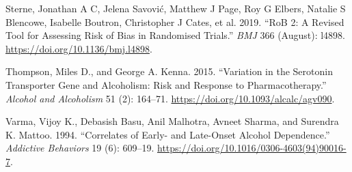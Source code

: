 \documentclass[
  12pt,
]{article}
\newlength{\cslhangindent}
\newenvironment{CSLReferences}[2] %
 {\begin{list}{}{%
  \setlength{\itemindent}{0pt}
  \setlength{\leftmargin}{0pt}
  \setlength{\parsep}{0pt}
  \ifodd #1
   \setlength{\leftmargin}{\cslhangindent}
   \setlength{\itemindent}{-1\cslhangindent}
  \fi
  \setlength{\itemsep}{#2\baselineskip}}}
 {\end{list}}
\begin{document}
\begin{CSLReferences}{1}{0}
Sterne, Jonathan A C, Jelena Savović, Matthew J Page, Roy G Elbers,
Natalie S Blencowe, Isabelle Boutron, Christopher J Cates, et al. 2019.
{``{RoB} 2: A Revised Tool for Assessing Risk of Bias in Randomised
Trials.''} \emph{BMJ} 366 (August): l4898.
\url{https://doi.org/10.1136/bmj.l4898}.

Thompson, Miles D., and George A. Kenna. 2015. {``Variation in the
{Serotonin Transporter Gene} and {Alcoholism}: {Risk} and {Response} to
{Pharmacotherapy}.''} \emph{Alcohol and Alcoholism} 51 (2): 164--71.
\url{https://doi.org/10.1093/alcalc/agv090}.

Varma, Vijoy K., Debasish Basu, Anil Malhotra, Avneet Sharma, and
Surendra K. Mattoo. 1994. {``Correlates of Early- and Late-Onset Alcohol
Dependence.''} \emph{Addictive Behaviors} 19 (6): 609--19.
\url{https://doi.org/10.1016/0306-4603(94)90016-7}.

\end{CSLReferences}
\end{document}
